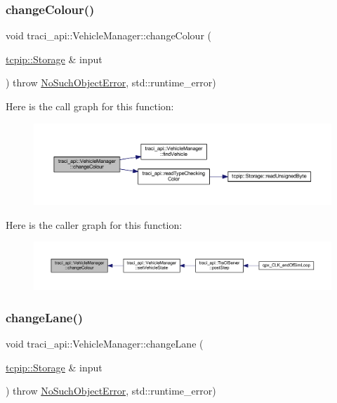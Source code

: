 \subsubsection{\texorpdfstring{change\+Colour()}{changeColour()}}
{\footnotesize\ttfamily void traci\+\_\+api\+::\+Vehicle\+Manager\+::change\+Colour (\begin{DoxyParamCaption}\item[{\hyperlink{classtcpip_1_1_storage}{tcpip\+::\+Storage} \&}]{input }\end{DoxyParamCaption}) throw  \hyperlink{classtraci__api_1_1_no_such_object_error}{No\+Such\+Object\+Error}, std\+::runtime\+\_\+error) }

Here is the call graph for this function\+:\nopagebreak
\begin{figure}[H]
\begin{center}
\leavevmode
\includegraphics[width=350pt]{classtraci__api_1_1_vehicle_manager_a6829e259033dcd95611755953f164ef0_cgraph}
\end{center}
\end{figure}
Here is the caller graph for this function\+:\nopagebreak
\begin{figure}[H]
\begin{center}
\leavevmode
\includegraphics[width=350pt]{classtraci__api_1_1_vehicle_manager_a6829e259033dcd95611755953f164ef0_icgraph}
\end{center}
\end{figure}
\mbox{\label{classtraci__api_1_1_vehicle_manager_a5441f5ea01a06473f831ac85b9a6c70f}} 
\subsubsection{\texorpdfstring{change\+Lane()}{changeLane()}}
{\footnotesize\ttfamily void traci\+\_\+api\+::\+Vehicle\+Manager\+::change\+Lane (\begin{DoxyParamCaption}\item[{\hyperlink{classtcpip_1_1_storage}{tcpip\+::\+Storage} \&}]{input }\end{DoxyParamCaption}) throw  \hyperlink{classtraci__api_1_1_no_such_object_error}{No\+Such\+Object\+Error}, std\+::runtime\+\_\+error) }

